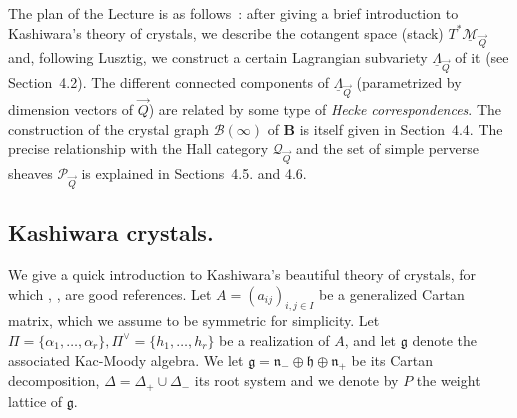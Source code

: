 \documentclass[a4paper,10pt]{amsart}
\def\a{\alpha}
\def\g{\mathfrak{g}}
\def\h{\mathfrak{h}}
\def\n{\mathfrak{n}}
\def\QQ{\mathcal{Q}_{\vec{Q}}}
\def\PQ{\mathcal{P}_{\vec{Q}}}
\numberwithin{equation}{section}
\begin{document}
\vspace{.1in}

The plan of the Lecture is as follows~: after giving a brief introduction to Kashiwara's theory of crystals, we describe the cotangent space (stack) $T^*\underline{\mathcal{M}}_{\vec{Q}}$ and, following Lusztig, we construct a certain Lagrangian subvariety $\underline{\Lambda}_{\vec{Q}}$ of it (see Section~4.2). The different connected components of $\underline{\Lambda}_{\vec{Q}}$ (parametrized by dimension vectors of $\vec{Q}$) are related by some type of \textit{Hecke correspondences}. The construction of the crystal graph $\mathcal{B}(\infty)$ of $\mathbf{B}$ is itself given in Section~4.4. The precise relationship with the Hall category $\QQ$ and the set of simple perverse sheaves $\PQ$ is explained in Sections~4.5. and 4.6.

\vspace{.3in}


\subsection{Kashiwara crystals.}

\vspace{.15in}

We give a quick introduction to Kashiwara's beautiful theory of crystals, for which \cite{Jo}, \cite{Kang}, \cite{Kash} are good references. Let $A=(a_{ij})_{i,j\in I}$ be a generalized Cartan matrix, which we assume to be symmetric for simplicity. Let $\Pi=\{\a_1, \ldots, \a_r\}, \Pi^{\vee}=\{h_1, \ldots, h_r\}$ be a realization of $A$, and let $\g$ denote the associated Kac-Moody algebra. We let $\g=\n_- \oplus \h \oplus \n_+$ be its Cartan decomposition, $\Delta=\Delta_+ \cup \Delta_-$ its root system and we denote by $P$ the weight lattice of $\g$.

\vspace{.2in}
\end{document}
